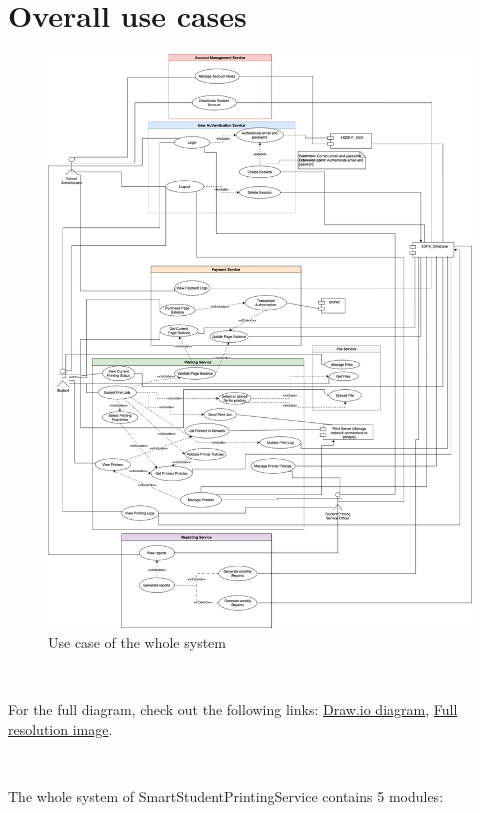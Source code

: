 \section{Overall use cases}

\begin{figure}[H]
  \includegraphics[max width=0.9\linewidth]{chapters/3. use-case-diagram/overall-use-case-diagram.png}
  \caption{Use case of the whole system}%
\end{figure}

\

For the full diagram, check out the following links: \href{https://drive.google.com/file/d/1WRi-N7SIQ2TsGwEkwdd48GqCGhodFedc/view?usp=drive_link}{Draw.io diagram}, \href{https://drive.google.com/file/d/1CZHHrL5VMrCAE1oMELBysDtHTPctMH6j/view?usp=drive_link}{Full resolution image}.

\

The whole system of SmartStudentPrintingService contains 5 modules:

